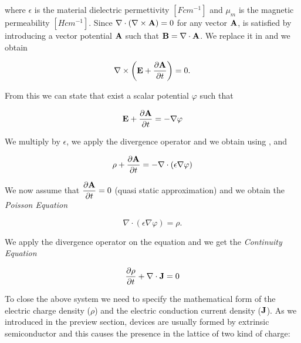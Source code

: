 where $\epsilon$ is the material dielectric permettivity $[F cm^{-1}]$ and $\mu_m$ is the magnetic permeability $[H cm^{-1}]$. Since $\nabla \cdot (\nabla \times \mathbf{A})=0$ for any vector $\mathbf{A}$,  is satisfied by introducing a vector potential $\mathbf{A}$ such that $\mathbf{B}= \nabla \cdot \mathbf{A}$. We replace it in  and we obtain

\begin{equation}
\nabla \times \left( \mathbf{E} + \dfrac{\partial \mathbf{A}}{\partial t} \right) = 0.
\end{equation}

From this we can state that exist a scalar potential $\varphi$ such that

\begin{equation}
\label{eq: potenziale scalare}
\mathbf{E} + \dfrac{\partial \mathbf{A}}{\partial t} = -\nabla \varphi
\end{equation}


We multiply  by $\epsilon$, we apply the divergence operator and we obtain using ,  and 

\begin{equation}
\rho + \dfrac{\partial \mathbf{A}}{\partial t}  = -\nabla \cdot (\epsilon \nabla \varphi)
\end{equation}

We now assume that $\dfrac{\partial \mathbf{A}}{\partial t} = 0$ (quasi static approximation) and we obtain the \textit{Poisson Equation}

\begin{equation}
\label{eq: Poisson equation}
\nabla \cdot (\epsilon \nabla \varphi) = \rho.
\end{equation} 
	
	We apply the divergence operator on the equation   and we get the \textit{Continuity Equation}

\begin{equation}
\dfrac{\partial \rho}{\partial t} + \nabla \cdot \mathbf{J}  =  0 \end{equation} 




To close the above system we need to specify the mathematical form of the electric charge density ($\rho$) and the electric conduction current density ($\mathbf{J}$).
As we introduced in the preview section, devices are usually formed by extrinsic semiconductor and this causes the presence in the lattice of two kind of charge:

